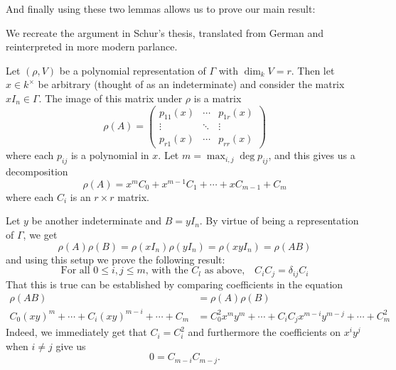 \documentclass[12pt]{article}
\begin{document}
And finally using these two lemmas allows us to prove our main result:
\begin{prf}
	We recreate the argument in Schur's thesis, translated from German and reinterpreted in more modern parlance. 
	
	Let $(\rho,V)$ be a polynomial representation of $\Gamma$ with $\dim_k V=r$. Then let $x\in k^\times$ be arbitrary (thought of as an indeterminate)
	and consider the matrix $xI_n\in\Gamma$. The image of this matrix under $\rho$ is a matrix 
	\[\rho(A)=\begin{pmatrix}
		p_{11}(x) & \cdots & p_{1r}(x)\\
		\vdots & \ddots & \vdots\\
		p_{r1}(x) & \cdots & p_{rr}(x)
	\end{pmatrix}\]
	where each $p_{ij}$ is a polynomial in $x$. Let $m=\max_{i,j}\deg p_{ij}$, and this gives us a decomposition 
	\[\rho(A)=x^m C_0+x^{m-1}C_1+\cdots+ xC_{m-1}+C_m\]
	where each $C_i$ is an $r\times r$ matrix.

	Let $y$ be another indeterminate and $B=yI_n$. By virtue of being a representation of $\Gamma$, we get 
	\[\rho(A)\rho(B)=\rho(xI_n)\rho(yI_n)=\rho(xyI_n)=\rho(AB)\]
	and using this setup we prove the following result: 
	\[\text{For all $0\le i,j\le m$, with the $C_l$ as above,}\quad C_iC_j=\delta_{ij}C_i\]
	That this is true can be established by comparing coefficients in the equation
	\begin{align*}
		\rho(AB)&=\rho(A)\rho(B)\\
		C_0(xy)^m+\cdots+C_i(xy)^{m-i}+\cdots+C_m&=C_0^2x^my^m+\cdots+C_iC_jx^{m-i}y^{m-j}+\cdots+C_m^2
	\end{align*}
	Indeed, we immediately get that $C_i=C_i^2$ and furthermore the coefficients on $x^iy^j$ when $i\ne j$ give us
	\[0=C_{m-i}C_{m-j}.\]
	

\end{prf}
\end{document}
